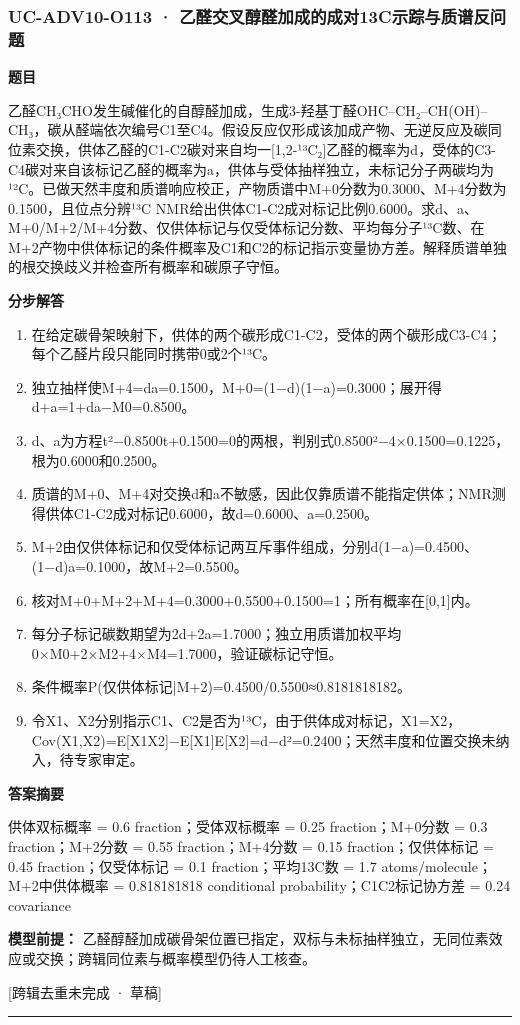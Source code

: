 \documentclass[UTF8,11pt,a4paper]{ctexart}
\begin{document}
\subsubsection*{UC-ADV10-O113 · 乙醛交叉醇醛加成的成对13C示踪与质谱反问题}
\noindent\textbf{题目}\par
乙醛CH₃CHO发生碱催化的自醇醛加成，生成3-羟基丁醛OHC–CH₂–CH(OH)–CH₃，碳从醛端依次编号C1至C4。假设反应仅形成该加成产物、无逆反应及碳同位素交换，供体乙醛的C1-C2碳对来自均一[1,2-¹³C₂]乙醛的概率为d，受体的C3-C4碳对来自该标记乙醛的概率为a，供体与受体抽样独立，未标记分子两碳均为¹²C。已做天然丰度和质谱响应校正，产物质谱中M+0分数为0.3000、M+4分数为0.1500，且位点分辨¹³C NMR给出供体C1-C2成对标记比例0.6000。求d、a、M+0/M+2/M+4分数、仅供体标记与仅受体标记分数、平均每分子¹³C数、在M+2产物中供体标记的条件概率及C1和C2的标记指示变量协方差。解释质谱单独的根交换歧义并检查所有概率和碳原子守恒。\par
\medskip\noindent\textbf{分步解答}
\begin{enumerate}
\item 在给定碳骨架映射下，供体的两个碳形成C1-C2，受体的两个碳形成C3-C4；每个乙醛片段只能同时携带0或2个¹³C。
\item 独立抽样使M+4=da=0.1500，M+0=(1−d)(1−a)=0.3000；展开得d+a=1+da−M0=0.8500。
\item d、a为方程t²−0.8500t+0.1500=0的两根，判别式0.8500²−4×0.1500=0.1225，根为0.6000和0.2500。
\item 质谱的M+0、M+4对交换d和a不敏感，因此仅靠质谱不能指定供体；NMR测得供体C1-C2成对标记0.6000，故d=0.6000、a=0.2500。
\item M+2由仅供体标记和仅受体标记两互斥事件组成，分别d(1−a)=0.4500、(1−d)a=0.1000，故M+2=0.5500。
\item 核对M+0+M+2+M+4=0.3000+0.5500+0.1500=1；所有概率在[0,1]内。
\item 每分子标记碳数期望为2d+2a=1.7000；独立用质谱加权平均0×M0+2×M2+4×M4=1.7000，验证碳标记守恒。
\item 条件概率P(仅供体标记|M+2)=0.4500/0.5500≈0.8181818182。
\item 令X1、X2分别指示C1、C2是否为¹³C，由于供体成对标记，X1=X2，Cov(X1,X2)=E[X1X2]−E[X1]E[X2]=d−d²=0.2400；天然丰度和位置交换未纳入，待专家审定。
\end{enumerate}
\noindent\textbf{答案摘要}\par
供体双标概率 = 0.6 fraction；受体双标概率 = 0.25 fraction；M+0分数 = 0.3 fraction；M+2分数 = 0.55 fraction；M+4分数 = 0.15 fraction；仅供体标记 = 0.45 fraction；仅受体标记 = 0.1 fraction；平均13C数 = 1.7 atoms/molecule；M+2中供体概率 = 0.818181818 conditional probability；C1C2标记协方差 = 0.24 covariance\par
\noindent\textbf{模型前提：}
乙醛醇醛加成碳骨架位置已指定，双标与未标抽样独立，无同位素效应或交换；跨辑同位素与概率模型仍待人工核查。\par
\noindent\textcolor{red!65!black}{[跨辑去重未完成 · 草稿]} \par
\medskip\hrule\medskip
{}
\end{document}
